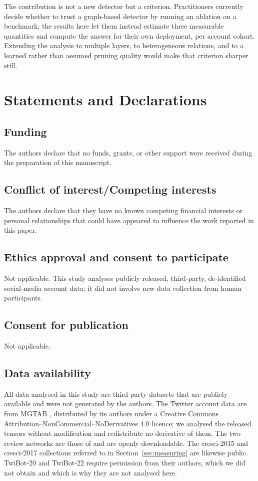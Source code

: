 \documentclass[onecolumn,pdflatex,sn-basic,Numbered]{sn-jnl}
\theoremstyle{thmstyleone}
\theoremstyle{thmstylethree}
\begin{document}
The contribution is not a new detector but a criterion. Practitioners currently
decide whether to trust a graph-based detector by running an ablation on a
benchmark; the results here let them instead estimate three measurable quantities
and compute the answer for their own deployment, per account cohort. Extending the
analysis to multiple layers, to heterogeneous relations, and to a learned rather
than assumed pruning quality would make that criterion sharper still.



\backmatter

\section*{Statements and Declarations}

\subsection*{Funding}
The authors declare that no funds, grants, or other support were received during the
preparation of this manuscript.

\subsection*{Conflict of interest/Competing interests}
The authors declare that they have no known competing financial interests or personal
relationships that could have appeared to influence the work reported in this paper.

\subsection*{Ethics approval and consent to participate}
Not applicable. This study analyses publicly released, third-party, de-identified
social-media account data; it did not involve new data collection from human
participants.

\subsection*{Consent for publication}
Not applicable.

\subsection*{Data availability}
All data analysed in this study are third-party datasets that are publicly available
and were not generated by the authors. The Twitter account data are from MGTAB
\citep{shi2023mgtab}, distributed by its authors under a Creative Commons
Attribution--NonCommercial--NoDerivatives 4.0 licence; we analysed the released
tensors without modification and redistribute no derivative of them. The two review
networks are those of \citet{dou2020caregnn} and are openly downloadable. The
cresci-2015 and cresci-2017 collections referred to in
Section~\ref{sec:measuring} are likewise public. TwiBot-20 and TwiBot-22 require
permission from their authors, which we did not obtain and which is why they are not
analysed here.
\end{document}
